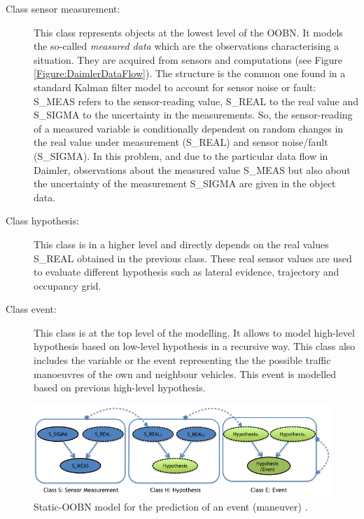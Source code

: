 \begin{description}
\item[Class sensor measurement:]  This class represents objects at the lowest level of the OOBN. It models the so-called \textit{measured data} which are  the observations characterising a situation. They are acquired from sensors and computations (see Figure \ref{Figure:DaimlerDataFlow}). The structure is the common one found in a standard Kalman filter model to account for sensor noise or fault:  S\_MEAS refers to the sensor-reading value, S\_REAL to the real value and S\_SIGMA to the uncertainty in the measurements. So, the sensor-reading of a measured variable is conditionally dependent on random changes in the real value under measurement (S\_REAL) and sensor noise/fault (S\_SIGMA).  In this problem,  and due to the particular data flow in  Daimler, observations about the measured value S\_MEAS but also about the uncertainty of the measurement S\_SIGMA are given in the object data. 

\item[Class hypothesis:] This class is in a higher level and  directly depends on the real values S\_REAL obtained in the previous class. These real sensor values  are used to evaluate different hypothesis such as lateral evidence, trajectory and occupancy grid. 

\item[Class event:] This class is at the top level of the modelling. It allows to model high-level hypothesis based on low-level hypothesis in a recursive way. This class also includes the variable or the event  representing the the possible traffic manoeuvres of the own and neighbour vehicles. This event is modelled based on previous high-level hypothesis. 

\end{description}

\begin{figure}
\begin{center}
\includegraphics[scale=0.58]{./figures/DaimlerOOBNAbstraction}
\caption{\label{Figure:DaimlerOOBNAbstraction} Static-OOBN model for the prediction of an event (maneuver) \cite{Weidl2014}.}
\end{center}
\end{figure}

